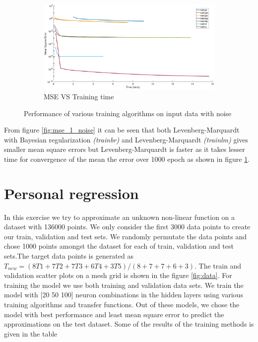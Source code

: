 \begin{figure}[!htpb]
\begin{subfigure}[b]{0.33\textwidth}
		\centering
		\captionsetup{width=0.8\linewidth, format = hang}
		\includegraphics[height = 0.7\textwidth,width = 1\textwidth]{Exercise1/Report/mse_2_noise}
		\caption{MSE VS Training time \newline}\label{fig:mse_2_noise}
	\end{subfigure}
	\captionsetup{format = hang}
	\caption{Performance of various training algorithms on input data with noise}
	\label{fig:train_perf_noise}
\end{figure}
From figure \ref{fig:mse_1_noise} it can be seen that both Levenberg-Marquardt with Bayesian regularization \textit{(trainbr)} and Levenberg-Marquardt \textit{(trainlm)} gives smaller mean square errors but Levenberg-Marquardt is faster as it takes lesser time for convergence of the mean the error over 1000 epoch as shown in figure \ref{fig:mse_2_noise}.
\section{Personal regression}
In this exercise we try to approximate an unknown non-linear function on a dataset with 136000 points. We only consider the first 3000 data points to create our train, validation and test sets. We randomly permutate the data points and chose 1000 points amongst the dataset for each of train, validation and test sets.The target data points is generated as $T_{new} = (8T1+7T2+7T3+6T4+ 3T5)/(8+7+7+6+3)$. The train and validation scatter plots on a mesh grid is shown in the figure \ref{fig:data}. For training the model we use both training and validation data sets. We train the model with [20 50 100] neuron combinations in the hidden layers using various training algorithms and transfer functions. Out of these models, we chose the model with best performance and least mean square error to predict the approximations on the test dataset. Some of the results of the training methods is given in the table

